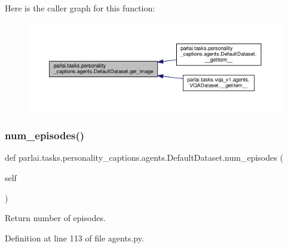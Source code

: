 Here is the caller graph for this function\+:
\nopagebreak
\begin{figure}[H]
\begin{center}
\leavevmode
\includegraphics[width=350pt]{classparlai_1_1tasks_1_1personality__captions_1_1agents_1_1DefaultDataset_a1af0abcddf51525898da67e2e796c525_icgraph}
\end{center}
\end{figure}
\mbox{\label{classparlai_1_1tasks_1_1personality__captions_1_1agents_1_1DefaultDataset_a09fb1bf7bf9dc5ab00ef9f32388336ea}} 
\subsubsection{\texorpdfstring{num\+\_\+episodes()}{num\_episodes()}}
{\footnotesize\ttfamily def parlai.\+tasks.\+personality\+\_\+captions.\+agents.\+Default\+Dataset.\+num\+\_\+episodes (\begin{DoxyParamCaption}\item[{}]{self }\end{DoxyParamCaption})}

\begin{DoxyVerb}Return number of episodes.\end{DoxyVerb}
 

Definition at line 113 of file agents.\+py.



